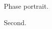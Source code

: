 \documentclass{svmult}
\begin{document}
\begin{figure}[b]
\sidecaption[t]
\caption{Phase portrait.}
\end{figure}
\begin{figure}[b]
\sidecaption
{}
\caption{Second.}
\end{figure}
\end{document}
